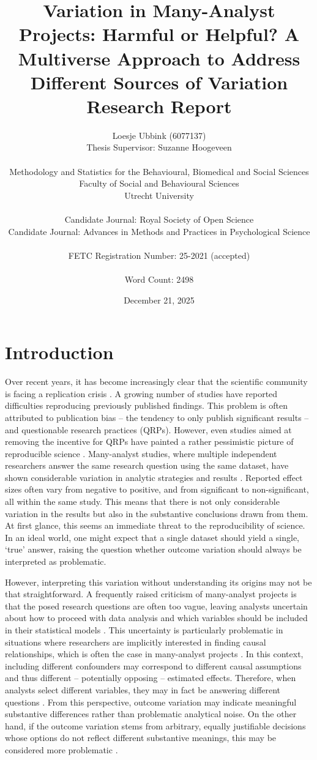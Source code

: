 \documentclass{article}
\title{Variation in Many-Analyst Projects: Harmful or Helpful? A Multiverse Approach to Address Different Sources of Variation \\ \small Research Report}
\author{Loesje Ubbink (6077137) \\ Thesis Supervisor: Suzanne Hoogeveen \\ \\ \small Methodology and Statistics for the Behavioural, Biomedical and Social Sciences \\ \small Faculty of Social and Behavioural Sciences\\ \small Utrecht University \\ \\ \small Candidate Journal: Royal Society of Open Science \\ \small Candidate Journal: Advances in Methods and Practices in Psychological Science  \\ \\ FETC Registration Number: 25-2021 (accepted) \\ \\ Word Count: 2498}
\date{December 21, 2025}
\begin{document}
\maketitle
\newpage
\section*{Introduction}
Over recent years, it has become increasingly clear that the scientific community is facing a replication crisis \citep[e.g.,][]{forbes_supporting_2023}. A growing number of studies have reported difficulties reproducing previously published findings. This problem is often attributed to publication bias – the tendency to only publish significant results – and questionable research practices (QRPs). However, even studies aimed at removing the incentive for QRPs have painted a rather pessimistic picture of reproducible science \citep{auspurg_toward_2024}. Many-analyst studies, where multiple independent researchers answer the same research question using the same dataset, have shown considerable variation in analytic strategies and results \citep[e.g.,][]{silberzahn_many_2018, bastiaansen_time_2020,breznau_observing_2022,hoogeveen_many-analysts_2023, gould_same_2025, kowall_marital_2025}. Reported effect sizes often vary from negative to positive, and from significant to non-significant, all within the same study. This means that there is not only considerable variation in the results but also in the substantive conclusions drawn from them. At first glance, this seems an immediate threat to the reproducibility of science. In an ideal world, one might expect that a single dataset should yield a single, `true' answer, raising the question whether outcome variation should always be interpreted as problematic.

However, interpreting this variation without understanding its origins may not be that straightforward. A frequently raised criticism of many-analyst projects is that the posed research questions are often too vague, leaving analysts uncertain about how to proceed with data analysis and which variables should be included in their statistical models \citep{kummerfeld_one_2023, hoogeveen_many-analysts_2023-1}. This uncertainty is particularly problematic in situations where researchers are implicitly interested in finding causal relationships, which is often the case in many-analyst projects \citep{del_giudice_travelers_2021, bulbulia_workflow_2023, rohrer_what_2025}. In this context, including different confounders may correspond to different causal assumptions and thus different – potentially opposing – estimated effects. Therefore, when analysts select different variables, they may in fact be answering different questions \citep{simonsohn_specification_2015}. From this perspective, outcome variation may indicate meaningful substantive differences rather than problematic analytical noise. On the other hand, if the outcome variation stems from arbitrary, equally justifiable decisions whose options do not reflect different substantive meanings, this may be considered more problematic \citep{del_giudice_travelers_2021}. 
\end{document}
